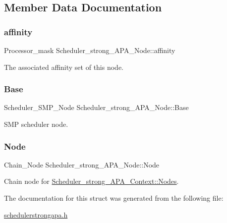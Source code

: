 \subsection{Member Data Documentation}
\mbox{\label{structScheduler__strong__APA__Node_a2e8928b11f1738a11c228780eb849989}} 
\subsubsection{\texorpdfstring{affinity}{affinity}}
{\footnotesize\ttfamily Processor\+\_\+mask Scheduler\+\_\+strong\+\_\+\+A\+P\+A\+\_\+\+Node\+::affinity}



The associated affinity set of this node. 

\mbox{\label{structScheduler__strong__APA__Node_ae86cbf5fd8743267abe33bed6d8b0fe6}} 
\subsubsection{\texorpdfstring{Base}{Base}}
{\footnotesize\ttfamily Scheduler\+\_\+\+S\+M\+P\+\_\+\+Node Scheduler\+\_\+strong\+\_\+\+A\+P\+A\+\_\+\+Node\+::\+Base}



S\+MP scheduler node. 

\mbox{\label{structScheduler__strong__APA__Node_aed93ad80a3757ffbbe0a0d1b5426b3cc}} 
\subsubsection{\texorpdfstring{Node}{Node}}
{\footnotesize\ttfamily Chain\+\_\+\+Node Scheduler\+\_\+strong\+\_\+\+A\+P\+A\+\_\+\+Node\+::\+Node}



Chain node for \hyperlink{structScheduler__strong__APA__Context_a07cebd5016654b5c7d05ec9982449d4d}{Scheduler\+\_\+strong\+\_\+\+A\+P\+A\+\_\+\+Context\+::\+Nodes}. 



The documentation for this struct was generated from the following file\+:\begin{DoxyCompactItemize}
\item 
\hyperlink{schedulerstrongapa_8h}{schedulerstrongapa.\+h}\end{DoxyCompactItemize}
